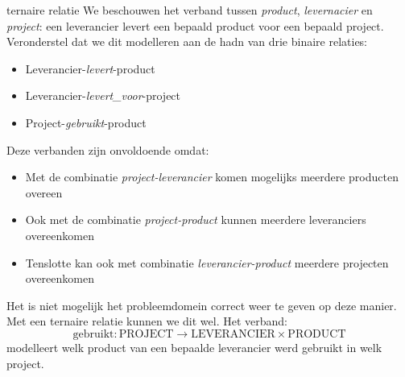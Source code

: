 \documentclass[../main.tex]{subfiles}
\begin{document}
\begin{ex}{ternaire relatie}
We beschouwen het verband tussen \textit{product}, \textit{levernacier} en \textit{project}: een leverancier levert een bepaald product voor een bepaald project. Veronderstel dat we dit modelleren aan de hadn van drie binaire relaties:
\begin{itemize}
	\item Leverancier-\textit{levert}-product
	\item Leverancier-\textit{levert\_voor}-project
	\item Project-\textit{gebruikt}-product
\end{itemize}
Deze verbanden zijn onvoldoende omdat:
\begin{itemize}
	\item Met de combinatie \textit{project-leverancier} komen mogelijks meerdere producten overeen
	\item Ook met de combinatie \textit{project-product} kunnen meerdere leveranciers overeenkomen
	\item Tenslotte kan ook met combinatie \textit{leverancier-product} meerdere projecten overeenkomen
\end{itemize}
Het is niet mogelijk het probleemdomein correct weer te geven op deze manier. Met een ternaire relatie kunnen we dit wel. Het verband:\\
\begin{equation*}
\boxed{\textrm{gebruikt} : \textrm{PROJECT} \rightarrow \textrm{LEVERANCIER} \times \textrm{PRODUCT}}
\end{equation*}
modelleert welk product van een bepaalde leverancier werd gebruikt in welk project.
\end{ex}
\end{document}
